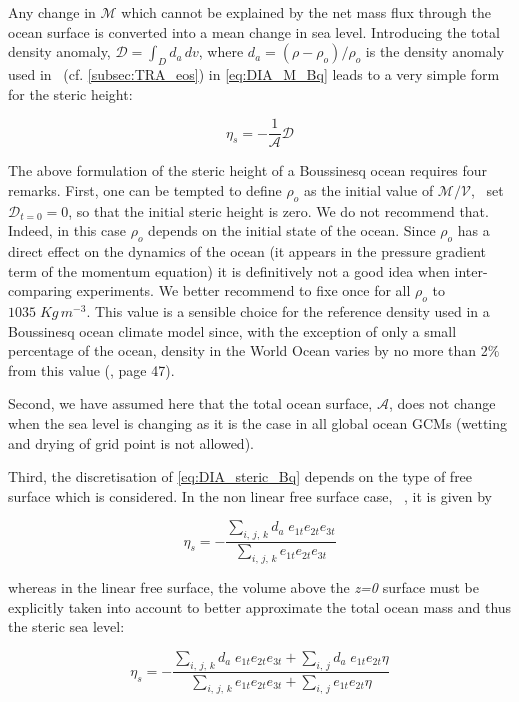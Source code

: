 \documentclass[../main/NEMO_manual]{subfiles}
\begin{document}
Any change in $\mathcal{M}$ which cannot be explained by the net mass flux through the ocean surface
is converted into a mean change in sea level.
Introducing the total density anomaly, $\mathcal{D}= \int_D d_a \,dv$,
where $d_a = (\rho -\rho_o ) / \rho_o$ is the density anomaly used in \NEMO\ (cf. \autoref{subsec:TRA_eos})
in \autoref{eq:DIA_M_Bq} leads to a very simple form for the steric height:

\begin{equation}
  \eta_s = - \frac{1}{\mathcal{A}} \mathcal{D}
  \label{eq:DIA_steric_Bq}
\end{equation}

The above formulation of the steric height of a Boussinesq ocean requires four remarks.
First, one can be tempted to define $\rho_o$ as the initial value of $\mathcal{M}/\mathcal{V}$,
\ie\ set $\mathcal{D}_{t=0}=0$, so that the initial steric height is zero.
We do not recommend that.
Indeed, in this case $\rho_o$ depends on the initial state of the ocean.
Since $\rho_o$ has a direct effect on the dynamics of the ocean
(it appears in the pressure gradient term of the momentum equation)
it is definitively not a good idea when inter-comparing experiments.
We better recommend to fixe once for all $\rho_o$ to $1035\;Kg\,m^{-3}$.
This value is a sensible choice for the reference density used in a Boussinesq ocean climate model since,
with the exception of only a small percentage of the ocean, density in the World Ocean varies by no more than
2$\%$ from this value (\cite{gill_bk82}, page 47).

Second, we have assumed here that the total ocean surface, $\mathcal{A}$,
does not change when the sea level is changing as it is the case in all global ocean GCMs
(wetting and drying of grid point is not allowed).

Third, the discretisation of \autoref{eq:DIA_steric_Bq} depends on the type of free surface which is considered.
In the non linear free surface case, \ie\ , it is given by

\[
  \eta_s = - \frac{ \sum_{i,\,j,\,k} d_a\; e_{1t} e_{2t} e_{3t} }{ \sum_{i,\,j,\,k}       e_{1t} e_{2t} e_{3t} }
\]

whereas in the linear free surface,
the volume above the \textit{z=0} surface must be explicitly taken into account to
better approximate the total ocean mass and thus the steric sea level:

\[
  \eta_s = - \frac{ \sum_{i,\,j,\,k} d_a\; e_{1t}e_{2t}e_{3t} + \sum_{i,\,j} d_a\; e_{1t}e_{2t} \eta }
                  { \sum_{i,\,j,\,k}       e_{1t}e_{2t}e_{3t} + \sum_{i,\,j}       e_{1t}e_{2t} \eta }
\]
\end{document}
